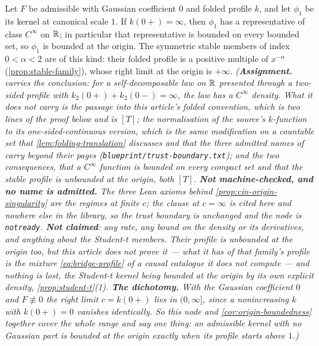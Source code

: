 \begin{corollary}\label{cor:origin-smooth}
\notready
Let $F$ be admissible with Gaussian coefficient $0$ and folded profile $k$, and let $\phi_1$ be
its kernel at canonical scale $1$. If $k(0{+}) = \infty$, then $\phi_1$ has a representative of
class $C^\infty$ on $\mathbb{R}$; in particular that representative is bounded on every bounded set, so
$\phi_1$ is bounded at the origin. The symmetric stable members of index $0 < \alpha < 2$ are of
this kind: their folded profile is a positive multiple of $x^{-\alpha}$
(\ref{prop:stable-family}), whose right limit at the origin is $+\infty$.
\statusA\quad{}\quad\emph{(\textbf{Assignment.}  carries the conclusion:
for a self-decomposable law on $\mathbb{R}$ presented through a two-sided profile with
$k_2(0{+}) + k_2(0{-}) = \infty$, the law has a $C^\infty$ density. What it does not carry is
the passage into this article's folded convention, which is two lines of the proof below and is
$[T]$; the normalisation of the source's $k$-function to its one-sided-continuous version, which
is the same modification on a countable set that \ref{lem:folding-translation} discusses and that
the three admitted names of  carry beyond their pages
(\texttt{blueprint/trust-boundary.txt}); and the two consequences, that a $C^\infty$ function is
bounded on every compact set and that the stable profile is unbounded at the origin, both $[T]$.
\textbf{Not machine-checked, and no name is admitted.} The three Lean axioms behind
\ref{prop:cin-origin-singularity} are the regimes at \emph{finite} $c$; the clause at
$c = \infty$ is cited here and nowhere else in the library, so the trust boundary is unchanged
and the node is \texttt{notready}. \textbf{Not claimed}: any rate, any bound on the density or
its derivatives, and anything about the Student-t members. Their profile is unbounded at the
origin too, but this article does not prove it --- what it has of that family's profile is the
mixture \ref{eq:bridge-profile} of a causal catalogue it does not compute --- and nothing is
lost, the Student-t kernel being bounded at the origin by its own explicit density,
\ref{prop:student-t}(1).
\textbf{The dichotomy.} With the Gaussian coefficient $0$ and $F \not\equiv 0$ the right limit
$c = k(0{+})$ lies in $(0,\infty]$, since a nonincreasing $k$ with $k(0{+}) = 0$ vanishes
identically. So this node and \ref{cor:origin-boundedness} together cover the whole range and say
one thing: \emph{an admissible kernel with no Gaussian part is bounded at the origin exactly when
its profile starts above $1$.})}
\end{corollary}

